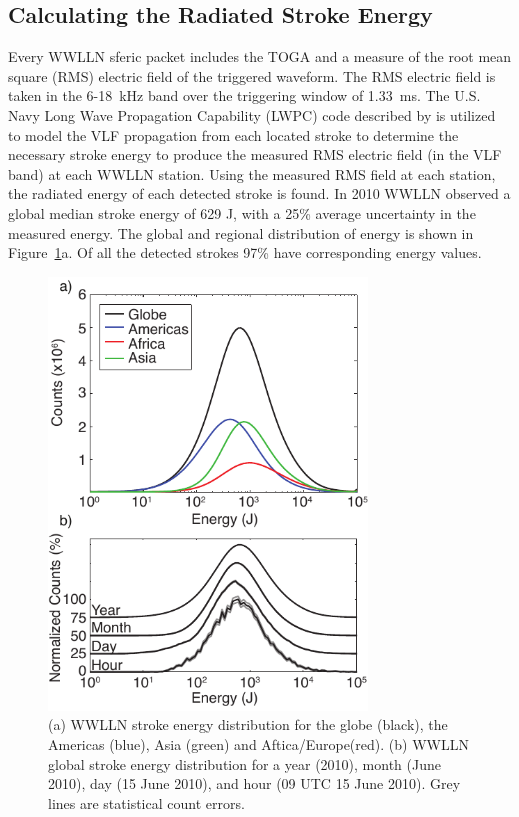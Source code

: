 \subsection{Calculating the Radiated Stroke Energy}

Every WWLLN sferic packet includes the TOGA and a measure of the root mean square (RMS) electric field of the triggered waveform.
The RMS electric field is taken in the 6-18~kHz band over the triggering window of 1.33~ms.
The U.S. Navy Long Wave Propagation Capability (LWPC) code described by \citet{Ferguson1998} is utilized to model the VLF propagation from each located stroke to determine the necessary stroke energy to produce the measured RMS electric field (in the VLF band) at each WWLLN station.
Using the measured RMS field at each station, the radiated energy of each detected stroke is found.
In 2010 WWLLN observed a global median stroke energy of 629 J, with a 25\% average uncertainty in the measured energy.
The global and regional distribution of energy is shown in Figure~\ref{efficiency:fig:2010_Energy}a.
Of all the detected strokes 97\% have corresponding energy values.
\citep{Hutchins2012}

\begin{figure}[ht!]
   \centering
\noindent\includegraphics[width=20pc]{efficiency/Figures/2012RS005049-p1.pdf}
   \caption{(a) WWLLN stroke energy distribution for the globe (black), the Americas (blue), Asia (green) and Aftica/Europe(red).
(b) WWLLN global stroke energy distribution for a year (2010), month (June 2010), day (15 June 2010), and hour (09 UTC 15 June 2010).
Grey lines are statistical count errors.}
   \label{efficiency:fig:2010_Energy}
\end{figure}

